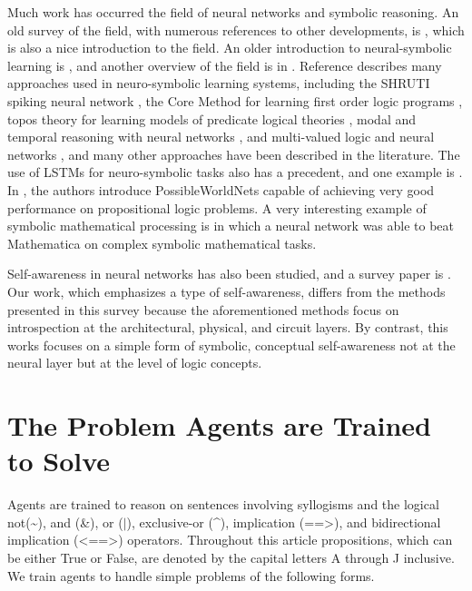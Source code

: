 \documentclass{article}
\begin{document}
Much work has occurred the field of neural networks and symbolic reasoning.
An old survey of the field, with numerous references to other developments, is
\cite{DBLP:journals/corr/abs-1711-03902}, which is also a nice introduction to
the field.
An older introduction to neural-symbolic learning is \cite{neural_symbolic_2002},
and another overview of the field is in
\cite{bica2015_integrated_neural_symbolic}.
Reference
\cite{neural_symbolic_2007} describes many approaches used in neuro-symbolic
learning systems, including the SHRUTI spiking neural network
\cite{shruti_2007}, the Core Method for learning first order logic programs
\cite{core_method_2007}, topos theory for learning models of
predicate logical theories \cite{topos_theory_2007}, modal and temporal
reasoning with neural networks \cite{modal_temporal_2007}, and multi-valued
logic and neural networks \cite{multi_valued_logic_2007}, and many other
approaches have been described in the literature.  The use of LSTMs for
neuro-symbolic tasks also has a precedent,
and one example is \cite{captcha_2017}.
In \cite{DBLP:journals/corr/abs-1802-08535}, the authors introduce PossibleWorldNets
capable of achieving very good performance on propositional logic problems.
A very interesting example of symbolic mathematical processing 
is \cite{lample2019deep} in which a neural network
was able to beat Mathematica on complex symbolic mathematical tasks.

Self-awareness in neural networks has also been studied, and a survey
paper is \cite{9045930}.  Our work, which emphasizes a type of self-awareness,
differs from the methods presented in this survey because the aforementioned
methods focus on introspection at the architectural, physical, and circuit
layers.  By contrast, this works focuses on a simple form of symbolic, conceptual
self-awareness not at the neural layer but at the level of logic concepts.

\section{The Problem Agents are Trained to Solve}

Agents are trained to reason on sentences involving syllogisms and the logical not(\textasciitilde), and (\&), or ($|$), exclusive-or (\textasciicircum), implication (==\textgreater), and bidirectional implication (\textless==\textgreater) operators. Throughout this article propositions, which can be either True or False, are denoted by the capital letters A through J inclusive. We train agents to handle simple problems of the following forms.
\end{document}
